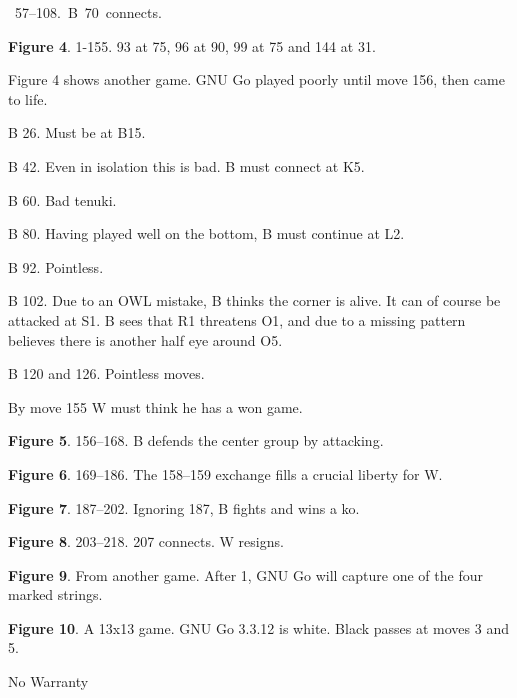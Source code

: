 \bigbreak
\hbox{\vbox{\hsize=1.15in\vglue 2in 57--108.
B 70 connects.
}
\vbox{}}
\medbreak

\bigbreak
\centerline{\hglue-20pt}
\medbreak
\centerline{{\bf Figure 4}. 1-155. 93 at 75, 96 at 90, 99 at 75 and 144 at 31.}

\bigbreak
Figure 4 shows another game. GNU Go played poorly until move 156,
then came to life.

{\parskip=8pt
B 26. Must be at B15.

B 42. Even in isolation this is bad. B must connect at K5.

B 60. Bad tenuki.

B 80. Having played well on the bottom, B must continue at L2.

B 92. Pointless.

B 102. Due to an OWL mistake, B thinks the corner is alive. It can of
course be attacked at S1. B sees that R1 threatens O1, and due to
a missing pattern believes there is another half eye around O5.

B 120 and 126. Pointless moves.

By move 155 W must think he has a won game.
}

\bigbreak
\centerline{\hglue-20pt}
\medbreak
\centerline{{\bf Figure 5}. 156--168. B defends the center group by attacking.}

\bigbreak

\centerline{\hglue-20pt}
\medbreak
\centerline{{\bf Figure 6}. 169--186. The 158--159 exchange fills a crucial
liberty for W.}

\centerline{\hglue-20pt}
\medbreak
\centerline{{\bf Figure 7}. 187--202. Ignoring 187, B fights and wins a ko.}
\bigbreak

\centerline{\hglue-20pt}
\medbreak
\centerline{{\bf Figure 8}. 203--218. 207 connects. W resigns.}

\centerline{\hglue-20pt}
\medbreak
\centerline{{\bf Figure 9}. From another game. After 1, GNU Go will
capture one of the four marked strings.}
\bigbreak

{\hfil{}\hfil{}}
\medbreak
\centerline{{\bf Figure 10}. A 13x13 game. GNU Go 3.3.12 is white. 
Black passes at moves 3 and 5.}

\vfil\eject

\centerline{\titlefont No Warranty}
\medbreak

